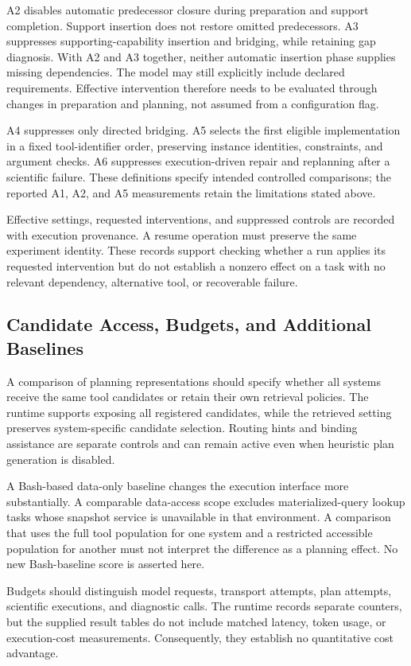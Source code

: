 A2 disables automatic predecessor closure during preparation and support completion. Support insertion does not restore omitted predecessors. A3 suppresses supporting-capability insertion and bridging, while retaining gap diagnosis. With A2 and A3 together, neither automatic insertion phase supplies missing dependencies. The model may still explicitly include declared requirements. Effective intervention therefore needs to be evaluated through changes in preparation and planning, not assumed from a configuration flag.

A4 suppresses only directed bridging. A5 selects the first eligible implementation in a fixed tool-identifier order, preserving instance identities, constraints, and argument checks. A6 suppresses execution-driven repair and replanning after a scientific failure. These definitions specify intended controlled comparisons; the reported A1, A2, and A5 measurements retain the limitations stated above.

Effective settings, requested interventions, and suppressed controls are recorded with execution provenance. A resume operation must preserve the same experiment identity. These records support checking whether a run applies its requested intervention but do not establish a nonzero effect on a task with no relevant dependency, alternative tool, or recoverable failure.

\subsection{Candidate Access, Budgets, and Additional Baselines}
A comparison of planning representations should specify whether all systems receive the same tool candidates or retain their own retrieval policies. The runtime supports exposing all registered candidates, while the retrieved setting preserves system-specific candidate selection. Routing hints and binding assistance are separate controls and can remain active even when heuristic plan generation is disabled.

A Bash-based data-only baseline changes the execution interface more substantially. A comparable data-access scope excludes materialized-query lookup tasks whose snapshot service is unavailable in that environment. A comparison that uses the full tool population for one system and a restricted accessible population for another must not interpret the difference as a planning effect. No new Bash-baseline score is asserted here.

Budgets should distinguish model requests, transport attempts, plan attempts, scientific executions, and diagnostic calls. The runtime records separate counters, but the supplied result tables do not include matched latency, token usage, or execution-cost measurements. Consequently, they establish no quantitative cost advantage.

